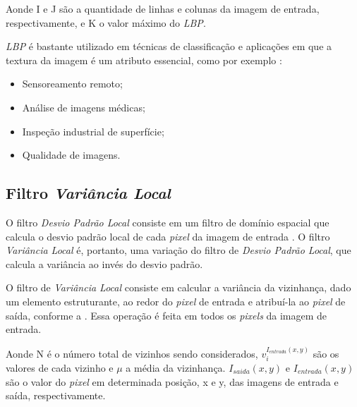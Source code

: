 
\par Aonde I e J são a quantidade de linhas e colunas da imagem de entrada, respectivamente, e K o valor máximo do \textit{\acrshort{LBP}}.

\par \textit{\acrshort{LBP}} é bastante utilizado em técnicas de classificação e aplicações em que a textura da imagem é um atributo essencial, como por exemplo \cite{ojala2002LBP}:

\begin{itemize}
    \item Sensoreamento remoto;
    \item Análise de imagens médicas;
    \item Inspeção industrial de superfície;
    \item Qualidade de imagens.
\end{itemize}


\subsection{Filtro \textit{Variância Local}}\label{sec:dom_esp:filtro_std}

\par O filtro \textit{Desvio Padrão Local} consiste em um filtro de domínio espacial que calcula o desvio padrão local de cada \textit{pixel} da imagem de entrada \cite{stdfilt}. O filtro \textit{Variância Local} é, portanto, uma variação do filtro de \textit{Desvio Padrão Local}, que calcula a variância ao invés do desvio padrão.

\par O filtro de \textit{Variância Local} consiste em calcular a variância da vizinhança, dado um elemento estruturante, ao redor do \textit{pixel} de entrada e atribuí-la ao \textit{pixel} de saída, conforme a . Essa operação é feita em todos os \textit{pixels} da imagem de entrada.


\par Aonde N é o número total de vizinhos sendo considerados, $v_{i}^{I_{entrada}(x,y)}$ são os valores de cada vizinho e $\mu$ a média da vizinhança. $I_{saida}(x,y)$ e $I_{entrada}(x,y)$ são o valor do \textit{pixel} em determinada posição, x e y, das imagens de entrada e saída, respectivamente.

